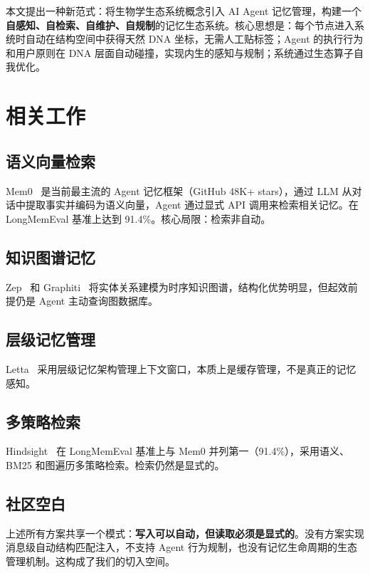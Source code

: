\documentclass[11pt,a4paper]{article}
\begin{document}
本文提出一种新范式：将生物学生态系统概念引入 AI Agent 记忆管理，构建一个\textbf{自感知、自检索、自维护、自规制}的记忆生态系统。核心思想是：每个节点进入系统时自动在结构空间中获得天然 DNA 坐标，无需人工贴标签；Agent 的执行行为和用户原则在 DNA 层面自动碰撞，实现内生的感知与规制；系统通过生态算子自我优化。

\section{相关工作}

\subsection{语义向量检索}
Mem0~\cite{mem0} 是当前最主流的 Agent 记忆框架（GitHub 48K+ stars），通过 LLM 从对话中提取事实并编码为语义向量，Agent 通过显式 API 调用来检索相关记忆。在 LongMemEval 基准上达到 91.4\%。核心局限：检索非自动。

\subsection{知识图谱记忆}
Zep~\cite{zep} 和 Graphiti~\cite{graphiti} 将实体关系建模为时序知识图谱，结构化优势明显，但起效前提仍是 Agent 主动查询图数据库。

\subsection{层级记忆管理}
Letta~\cite{letta} 采用层级记忆架构管理上下文窗口，本质上是缓存管理，不是真正的记忆感知。

\subsection{多策略检索}
Hindsight~\cite{hindsight} 在 LongMemEval 基准上与 Mem0 并列第一（91.4\%），采用语义、BM25 和图遍历多策略检索。检索仍然是显式的。

\subsection{社区空白}
上述所有方案共享一个模式：\textbf{写入可以自动，但读取必须是显式的}。没有方案实现消息级自动结构匹配注入，不支持 Agent 行为规制，也没有记忆生命周期的生态管理机制。这构成了我们的切入空间。
\end{document}
